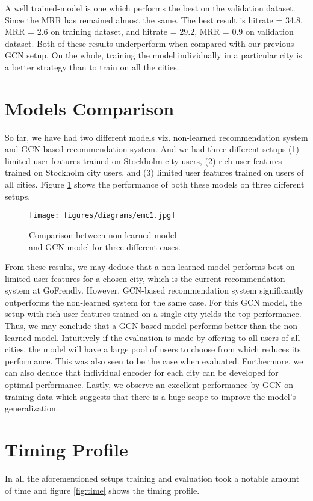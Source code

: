 \documentclass{kththesis}
\begin{document}
A well trained-model is one which performs the best on the validation dataset. Since the MRR has remained almost the same. The best result is hitrate = 34.8, MRR = 2.6 on training dataset, and hitrate = 29.2, MRR = 0.9 on validation dataset. Both of these results underperform when compared with our previous GCN setup. On the whole, training the model individually in a particular city is a better strategy than to train on all the cities.

\section{Models Comparison}
So far, we have had two different models viz. non-learned recommendation system and GCN-based recommendation system. And we had three different setups (1) limited user features trained on Stockholm city users, (2) rich user features trained on Stockholm city users, and (3) limited user features trained on users of all cities. Figure \ref{fig:emc1} shows the performance of both these models on three different setups.  \\

\begin{figure}[h!]
\centering
\captionsetup{justification=centering}
\texttt{[image: figures/diagrams/emc1.jpg]}
\caption{Comparison between non-learned model\\ and GCN model for three different cases.}
\label{fig:emc1}
\end{figure}

From these results, we may deduce that a non-learned model performs best on limited user features for a chosen city, which is the current recommendation system at GoFrendly. However, GCN-based recommendation system significantly outperforms the non-learned system for the same case. For this GCN model, the setup with rich user features trained on a single city yields the top performance. Thus, we may conclude that a GCN-based model performs better than the non-learned model. Intuitively if the evaluation is made by offering to all users of all cities, the model will have a large pool of users to choose from which reduces its performance. This was also seen to be the case when evaluated. Furthermore, we can also deduce that individual encoder for each city can be developed for optimal performance. Lastly, we observe an excellent performance by GCN on training data which suggests that there is a huge scope to improve the model's generalization.\\
\section{Timing Profile}
In all the aforementioned setups training and evaluation took a notable amount of time and figure \ref{fig:time} shows the timing profile. \\
\end{document}
